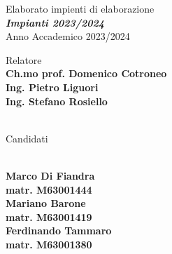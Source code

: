 \begin{titlepage}
\thispagestyle{empty}
\raggedright %


\vfill

{\large Elaborato impienti di elaborazione}
\\[1cm]
{\textbf{\textit{\LARGE Impianti 2023/2024}}}
\\[1cm]
{\large Anno Accademico 2023/2024}

\vfill


\begin{table}[h]
Relatore
\\
\textbf{Ch.mo prof. Domenico Cotroneo}
\\
\textbf{Ing. Pietro Liguori}
\\
\textbf{Ing. Stefano Rosiello}
\\ \\
{\raggedright Candidati}
\\
\textbf{Marco Di Fiandra}
\\
\textbf{matr. M63001444}
\\
\textbf{Mariano Barone}
\\
\textbf{matr. M63001419}
\\
\textbf{Ferdinando Tammaro}
\\
\textbf{matr. M63001380}
\end{table}

\end{titlepage}